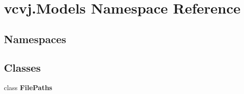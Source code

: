 \hypertarget{namespacevcvj_1_1_models}{}\section{vcvj.\+Models Namespace Reference}
\label{namespacevcvj_1_1_models}
\subsection*{Namespaces}
\begin{DoxyCompactItemize}
\end{DoxyCompactItemize}
\subsection*{Classes}
\begin{DoxyCompactItemize}
\item 
class {\bfseries File\+Paths}
\end{DoxyCompactItemize}
